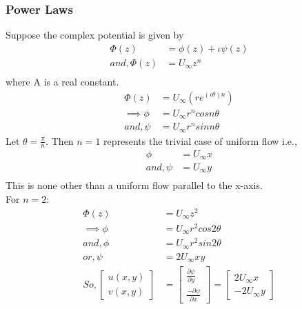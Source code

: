 \documentclass{book}
\begin{document}
\subsubsection{Power Laws}
Suppose the complex potential is given by\textemdash
\begin{equation*}
\begin{split}
\Phi(z)&=\phi(z)+\iota\psi(z)\\
and, \Phi(z)&=U_{\infty}z^n\\
\end{split}
\end{equation*}
where A is a real constant.
\begin{equation*}
\begin{split}
\Phi(z)&=U_{\infty}(re^{(\iota\theta)n})\\
\implies \phi&=U_{\infty}r^ncosn\theta \\
and, \psi&=U_{\infty}r^nsinn\theta
\end{split}
\end{equation*}
Let $\theta=\frac{\pi}{n}$. Then $n=1$ represents the trivial case of uniform flow i.e.,
\begin{equation*}
\begin{split}
\phi&=U_{\infty}x\\
and,\psi&=U_{\infty}y\\
\end{split}
\end{equation*}
This is none other than a uniform flow parallel to the x-axis.
\\
For $n=2$:
\begin{equation*}
\begin{split}
\Phi(z)&=U_{\infty}z^2\\
\implies \phi&=U_{\infty}r^2cos2\theta\\
and, \phi&=U_{\infty}r^2sin2\theta\\
or,\psi&=2U_{\infty}xy\\
So, \begin{bmatrix}u(x,y)\\v(x,y)\end{bmatrix}&=\begin{bmatrix}\frac{\partial \psi}{\partial y}\\[0.3cm]\frac{-\partial \psi}{\partial x}\end{bmatrix}=\begin{bmatrix}2U_{\infty}x\\[0.3cm]-2U_{\infty}y\end{bmatrix}
\end{split}
\end{equation*}
\end{document}
